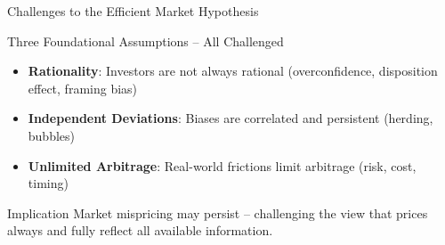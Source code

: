 \begin{frame}{Challenges to the Efficient Market Hypothesis}
	
	\begin{block}{Three Foundational Assumptions -- All Challenged}
		\begin{itemize}
			\item \textbf{Rationality}: Investors are not always rational (overconfidence, disposition effect, framing bias)
			\item \textbf{Independent Deviations}: Biases are correlated and persistent (herding, bubbles)
			\item \textbf{Unlimited Arbitrage}: Real-world frictions limit arbitrage (risk, cost, timing)
		\end{itemize}
	\end{block}
	
	\vspace{0.4cm}
	\begin{alertblock}{Implication}
		Market mispricing may persist -- challenging the view that prices always and fully reflect all available information.
	\end{alertblock}
	
\end{frame}


